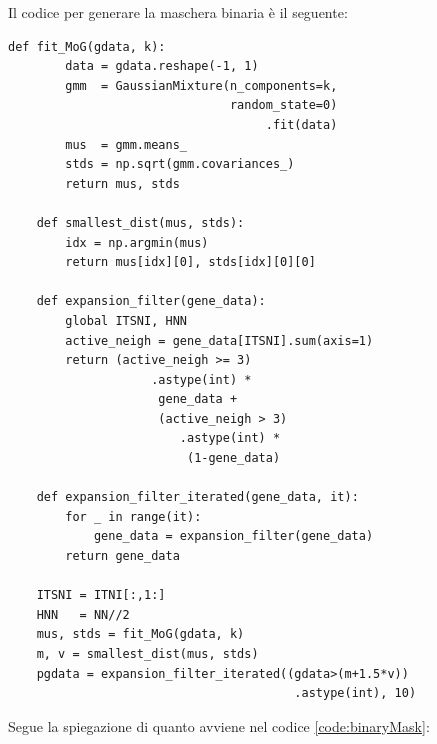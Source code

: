 \newpage\noindent
Il codice per generare la maschera binaria è il seguente:
\begin{lstlisting}[style=mypython,
				   label=code:binaryMask,
				   caption={Funzioni per ottenere le maschere binarie una volta ottenuta la k del Knee Point},
				   basicstyle=\ttfamily\scriptsize]
	def fit_MoG(gdata, k):
		data = gdata.reshape(-1, 1)
		gmm  = GaussianMixture(n_components=k,
							   random_state=0)
							   		.fit(data)
		mus  = gmm.means_
		stds = np.sqrt(gmm.covariances_)
		return mus, stds

	def smallest_dist(mus, stds):
    	idx = np.argmin(mus)
    	return mus[idx][0], stds[idx][0][0]
	
	def expansion_filter(gene_data):
		global ITSNI, HNN
		active_neigh = gene_data[ITSNI].sum(axis=1)
		return (active_neigh >= 3)
					.astype(int) * 
					 gene_data + 
					 (active_neigh > 3)
						.astype(int) * 
						 (1-gene_data)

	def expansion_filter_iterated(gene_data, it):
		for _ in range(it):
			gene_data = expansion_filter(gene_data)
		return gene_data
	
	ITSNI = ITNI[:,1:]
    HNN   = NN//2
	mus, stds = fit_MoG(gdata, k)
    m, v = smallest_dist(mus, stds)
    pgdata = expansion_filter_iterated((gdata>(m+1.5*v))
									  	.astype(int), 10)
\end{lstlisting}

\noindent
Segue la spiegazione di quanto avviene nel codice \ref{code:binaryMask}:

